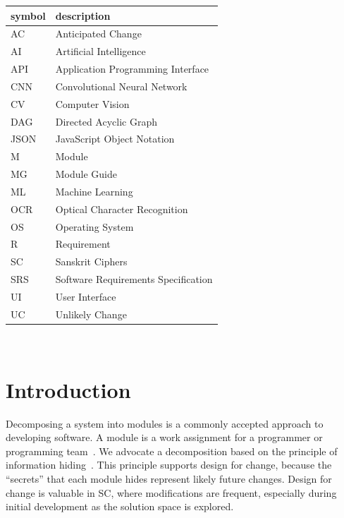 \documentclass[12pt, titlepage]{article}
\begin{document}
\renewcommand{\arraystretch}{1.2}
\begin{tabular}{l l} 
  \toprule
  \textbf{symbol} & \textbf{description}\\
  \midrule
  AC & Anticipated Change\\
  AI & Artificial Intelligence\\
  API & Application Programming Interface\\
  CNN & Convolutional Neural Network\\
  CV & Computer Vision\\
  DAG & Directed Acyclic Graph \\
  JSON & JavaScript Object Notation\\
  M & Module \\
  MG & Module Guide \\
  ML & Machine Learning\\
  OCR & Optical Character Recognition\\
  OS & Operating System \\
  R & Requirement\\
  SC & Sanskrit Ciphers\\
  SRS & Software Requirements Specification\\
  UI & User Interface\\
  UC & Unlikely Change \\
  \bottomrule
\end{tabular}\\

\newpage

\tableofcontents

\listoftables

\listoffigures

\newpage


\section{Introduction}

Decomposing a system into modules is a commonly accepted approach to developing
software.  A module is a work assignment for a programmer or programming
team~\citep{ParnasEtAl1984}.  We advocate a decomposition
based on the principle of information hiding~\citep{Parnas1972a}.  This
principle supports design for change, because the ``secrets'' that each module
hides represent likely future changes.  Design for change is valuable in SC,
where modifications are frequent, especially during initial development as the
solution space is explored.  
\end{document}
